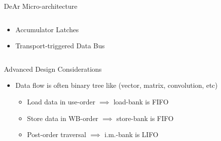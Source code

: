\documentclass{beamer}
\begin{document}
\begin{CJK}{UTF8}{bkai}
\begin{frame}{DeAr Micro-architecture}
\begin{columns}
\begin{column}{0.35\textwidth}
\begin{block}
\begin{itemize}
{\begin{itemize}
                                    \end{itemize}
                                }
                                \item <4->{Accumulator Latches}
                                \item <5->{Transport-triggered Data Bus}
                            \end{itemize}    
                        \end{block}
                    \end{column}
                \end{columns}
            \end{frame}

            \begin{frame}{Advanced Design Considerations}
                \centering
                {
                }
                \pause
                \begin{itemize}
                    \item {Data flow is often binary tree like (vector, matrix, convolution, etc)
                        \begin{itemize}
                                \pause
                                \item Load data in use-order $\implies$ load-bank is FIFO
                                \pause
                                \item Store data in WB-order $\implies$ store-bank is FIFO
                                \pause
                                \item Post-order traversal $\implies$ i.m.-bank is LIFO
                        \end{itemize}}
                \end{itemize}
            \end{frame}


\end{CJK}
\end{document}
